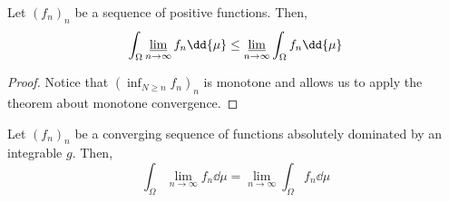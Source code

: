 \begin{thm}
    Let $(f_n)_n$ be a sequence of positive functions. Then, 
    \[\int_\Omega \varliminf_{n\to\infty} f_n \dd{\mu} \leq \varliminf_{n\to\infty}\int_\Omega f_n \dd{\mu}\]
\end{thm}
\begin{proof}
    Notice that \((\inf_{N\geq n}f_{n})_{n }\) is monotone and allows us to apply the theorem about monotone convergence.
\end{proof}


\begin{thm}
    Let $(f_n)_n$ be a converging sequence of functions absolutely dominated by an integrable $g$. Then, 
    \[\int_\Omega \lim_{n\to\infty} f_n \dd{\mu} = \lim_{n\to \infty} \int_\Omega f_n \dd{\mu}\]
\end{thm}



